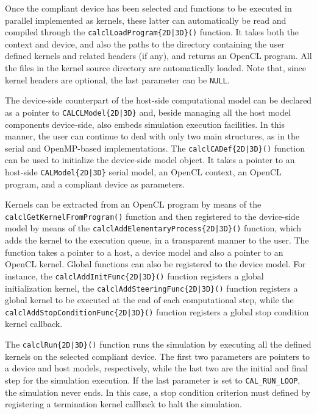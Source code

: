 Once the compliant device has been selected and functions to be
executed in parallel implemented as kernels, these latter can
automatically be read and compiled through the
\verb'calclLoadProgram{2D|3D}()' function. It takes both the
context and device, and also the paths to the directory containing
the user defined kernels and related headers (if any), and returns
an OpenCL program. All the files in the kernel source directory
are automatically loaded. Note that, since kernel headers are
optional, the last parameter can be \verb'NULL'.

The device-side counterpart of the host-side computational model
can be declared as a pointer to \verb'CALCLModel{2D|3D}' and,
beside managing all the host model components device-side, also
embeds simulation execution facilities. In this manner, the user
can continue to deal with only two main structures, as in the
serial and OpenMP-based implementations. The
\verb'calclCADef{2D|3D}()' function can be used to initialize the
device-side model object. It takes a pointer to an host-side
\verb'CALModel{2D|3D}' serial model, an OpenCL context, an OpenCL
program, and a compliant device as parameters.

Kernels can be extracted from an OpenCL program by means of the
\verb'calclGetKernelFromProgram()' function and then registered to
the device-side model by means of the
\verb'calclAddElementaryProcess{2D|3D}()' function, which adds the
kernel to the execution queue, in a transparent manner to the
user. The function takes a pointer to a host, a device model and
also a pointer to an OpenCL kernel. Global functions can also be
registered to the device model. For instance, the
\verb'calclAddInitFunc{2D|3D}()' function registers a global
initialization kernel, the \verb'calclAddSteeringFunc{2D|3D}()'
function registers a global kernel to be executed at the end of
each computational step, while the
\verb'calclAddStopConditionFunc{2D|3D}()' function registers a
global stop condition kernel callback.

The \verb'calclRun{2D|3D}()' function runs the simulation by
executing all the defined kernels on the selected compliant
device. The first two parameters are pointers to a device and host
models, respectively, while the last two are the initial and final
step for the simulation execution. If the last parameter is set to
\verb'CAL_RUN_LOOP', the simulation never ends. In this case, a
stop condition criterion must defined by registering a termination
kernel callback to halt the simulation.



